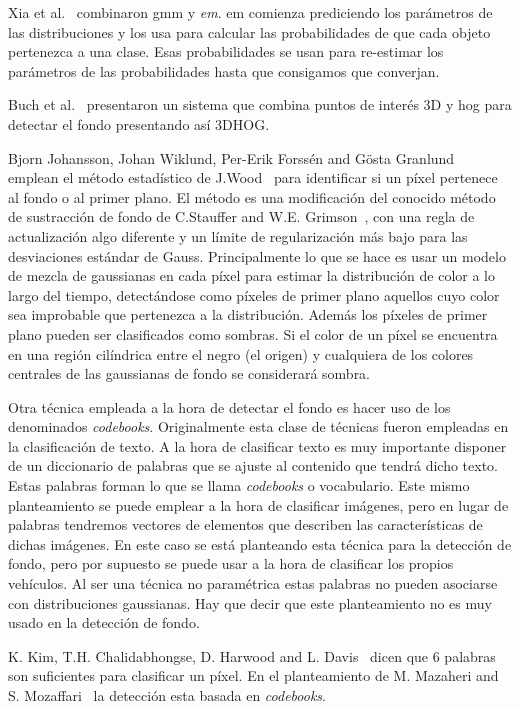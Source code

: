 Xia et al.~\cite{gmm_em_article} combinaron \acrshort{gmm} y \textit{\acrfull{em}}. \acrshort{em} comienza prediciendo los parámetros de las distribuciones y los usa para calcular las probabilidades de que cada objeto pertenezca a una clase. Esas probabilidades se usan para re-estimar los parámetros de las probabilidades hasta que consigamos que converjan. 

Buch et al.~\cite{3dhog_article}  presentaron un sistema que combina  puntos de interés 3D y \acrfull{hog} para detectar el fondo presentando así 3DHOG.


Bjorn Johansson, Johan Wiklund, Per-Erik Forssén and Gösta  Granlund~\cite{combining_shadow} emplean el método estadístico de J.Wood~\cite{wood} para identificar si un píxel pertenece al fondo o al primer plano. El método es una modificación del conocido método de sustracción de fondo de  C.Stauffer and  W.E.  Grimson~\cite{adaptative_background}, con una regla de actualización algo diferente y un límite de regularización más bajo para las desviaciones estándar de Gauss. Principalmente lo que se hace es usar un modelo de mezcla de gaussianas en cada píxel para estimar la distribución de color a lo largo del tiempo, detectándose como píxeles de primer plano aquellos cuyo color sea improbable que pertenezca a la distribución. Además los píxeles de primer plano pueden ser clasificados como sombras. Si el color de un píxel se encuentra en una región cilíndrica entre el negro (el origen) y cualquiera de los colores centrales de las gaussianas de fondo se considerará sombra.


Otra técnica empleada a la hora de detectar el fondo es hacer uso de los denominados \textit{codebooks}. Originalmente esta clase de técnicas fueron empleadas en la clasificación de texto. A la hora de clasificar texto es muy importante disponer de un diccionario de palabras que se ajuste al contenido que tendrá dicho texto. Estas palabras forman lo que se llama  \textit{codebooks} o vocabulario. Este mismo planteamiento se puede emplear a la hora de clasificar imágenes, pero en lugar de palabras tendremos vectores de elementos que describen las características de dichas imágenes.
En este caso se está planteando esta técnica para la detección de fondo, pero por supuesto se puede usar a la hora de clasificar los propios vehículos. Al ser una técnica no paramétrica estas palabras no pueden asociarse con distribuciones gaussianas. Hay que decir que este planteamiento no es muy usado en la detección de fondo.

K. Kim, T.H. Chalidabhongse, D. Harwood and L. Davis~\cite{real_time_foreground_background} dicen que 6 palabras son suficientes para clasificar un píxel. En el planteamiento de M. Mazaheri and S. Mozaffari~\cite{real_time_adaptative_background} la detección esta basada en \textit{codebooks}.

